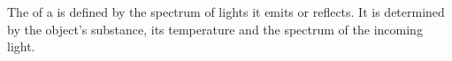 \begin{module}[id=color]
\begin{definition}
  The  of a  is defined by the spectrum of
  lights it emits or reflects. It is determined by the object's substance, its temperature
  and the spectrum of the incoming light.
\end{definition}
\end{module}



